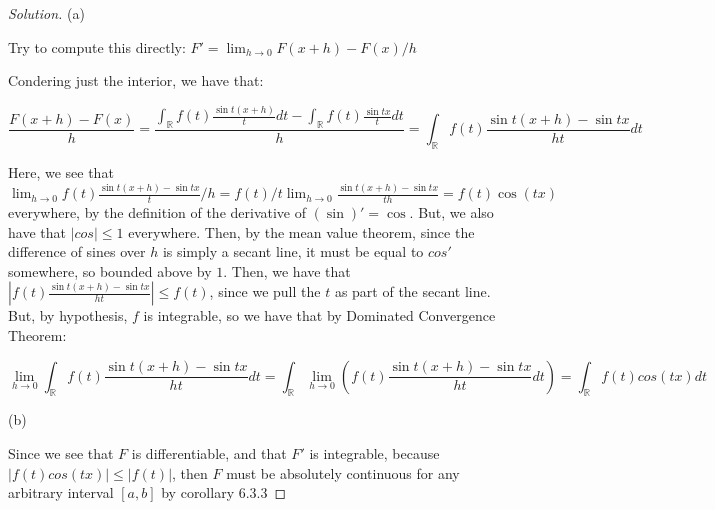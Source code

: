 \documentclass[10pt]{article}
\begin{document}
\begin{proof}[Solution]

(a)

Try to compute this directly: $F' = \lim_{h \to 0} F(x+h) - F(x) / h$

Condering just the interior, we have that:

$$\frac{ F(x+h) - F(x)}{h} = \frac{\int_\mathbb{R}  f(t) \frac{\sin t(x+h)}{t} dt - \int_\mathbb{R} f(t) \frac{\sin tx}{t} dt}{h} =  \int_\mathbb{R}  f(t) \frac{\sin t(x+h) - \sin tx}{ht} dt$$

Here, we see that $\lim_{h \to 0}  f(t) \frac{\sin t(x+h) - \sin tx}{t}/{h} = f(t)/t \lim_{h \to 0} \frac{\sin t(x+h) - \sin tx}{th} = f(t) \cos(tx)$ everywhere, by the definition of the derivative of $(\sin)' = \cos$. But, we also have that $|cos| \leq 1$ everywhere. Then, by the mean value theorem, since the difference of sines over $h$ is simply a secant line, it must be equal to $cos'$ somewhere, so bounded above by $1$. Then, we have that $| f(t) \frac{\sin t(x+h) - \sin tx}{ht}| \leq f(t) $, since we pull the $t$ as part of the secant line. But, by hypothesis, $f$ is integrable, so we have that by Dominated Convergence Theorem:

$$ \lim_{h \to 0}  \int_\mathbb{R}  f(t) \frac{\sin t(x+h) - \sin tx}{ht} dt =  \int_\mathbb{R}  \lim_{h \to 0} \left(  f(t) \frac{\sin t(x+h) - \sin tx}{ht} dt \right) =  \int_\mathbb{R} f(t) cos(tx) dt $$

(b)

Since we see that $F$ is differentiable, and that $F'$ is integrable, because $|f(t) cos(tx)| \leq |f(t)|$, then $F$ must be absolutely continuous for any arbitrary interval $[a,b]$ by corollary 6.3.3

\end{proof}
\end{document}
